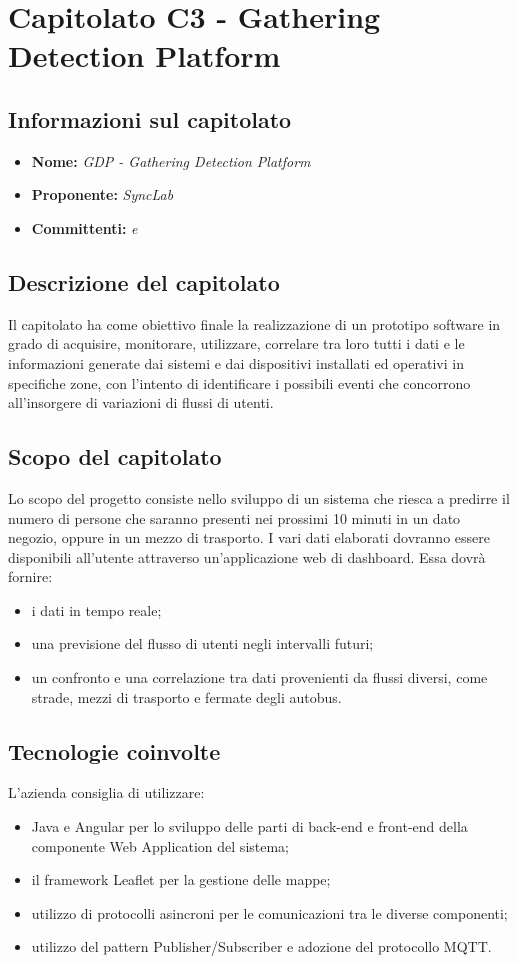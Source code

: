 \section{Capitolato C3 - Gathering Detection Platform}
\subsection{Informazioni sul capitolato}
\begin{itemize}
	\item \textbf{Nome:} \textit{GDP - Gathering Detection Platform} 
	\item \textbf{Proponente:} \textit{SyncLab}
	\item \textbf{Committenti:} \textit{\VT{} e \CR{}}
\end{itemize}

\subsection{Descrizione del capitolato}
Il capitolato ha come obiettivo finale la realizzazione di un prototipo software in grado di acquisire, monitorare, utilizzare, correlare tra loro tutti i dati e le informazioni generate dai sistemi e dai dispositivi installati ed operativi in specifiche zone, con l’intento di identificare i possibili eventi che concorrono all’insorgere di variazioni di flussi di utenti.

\subsection{Scopo del capitolato}
Lo scopo del progetto consiste nello sviluppo di un sistema che riesca a predirre il numero di persone che saranno presenti nei prossimi 10 minuti in un dato negozio, oppure in un mezzo di trasporto.
I vari dati elaborati dovranno essere disponibili all'utente attraverso un'applicazione web di dashboard. Essa dovrà fornire:
\begin{itemize}
	\item i dati in tempo reale;
	\item una previsione del flusso di utenti negli intervalli futuri;
	\item un confronto e una correlazione tra dati provenienti da flussi diversi, come strade, mezzi di trasporto e fermate degli autobus.
\end{itemize}

\subsection{Tecnologie coinvolte}
L'azienda consiglia di utilizzare:
\begin{itemize}
	\item Java e Angular per lo sviluppo delle parti di back-end e front-end della componente Web Application del sistema;
	\item il framework Leaflet per la gestione delle mappe;
	\item utilizzo di protocolli asincroni per le comunicazioni tra le diverse componenti;
	\item utilizzo del pattern Publisher/Subscriber e adozione del protocollo MQTT. 
\end{itemize}

